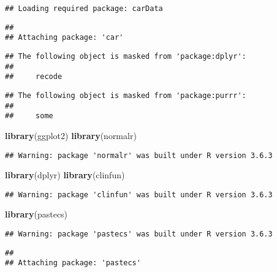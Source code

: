 \documentclass[
]{article}
\newenvironment{Shaded}{\begin{snugshade}}{\end{snugshade}}
\newcommand{\KeywordTok}[1]{\textcolor[rgb]{0.13,0.29,0.53}{\textbf{#1}}}
\newcommand{\NormalTok}[1]{#1}
\begin{document}
\begin{verbatim}
## Loading required package: carData
\end{verbatim}

\begin{verbatim}
## 
## Attaching package: 'car'
\end{verbatim}

\begin{verbatim}
## The following object is masked from 'package:dplyr':
## 
##     recode
\end{verbatim}

\begin{verbatim}
## The following object is masked from 'package:purrr':
## 
##     some
\end{verbatim}

\begin{Shaded}
\begin{Highlighting}[]
\KeywordTok{library}\NormalTok{(ggplot2)}
\KeywordTok{library}\NormalTok{(normalr)}
\end{Highlighting}
\end{Shaded}

\begin{verbatim}
## Warning: package 'normalr' was built under R version 3.6.3
\end{verbatim}

\begin{Shaded}
\begin{Highlighting}[]
\KeywordTok{library}\NormalTok{(dplyr)}
\KeywordTok{library}\NormalTok{(clinfun)}
\end{Highlighting}
\end{Shaded}

\begin{verbatim}
## Warning: package 'clinfun' was built under R version 3.6.3
\end{verbatim}

\begin{Shaded}
\begin{Highlighting}[]
\KeywordTok{library}\NormalTok{(pastecs)}
\end{Highlighting}
\end{Shaded}

\begin{verbatim}
## Warning: package 'pastecs' was built under R version 3.6.3
\end{verbatim}

\begin{verbatim}
## 
## Attaching package: 'pastecs'
\end{verbatim}
\end{document}
